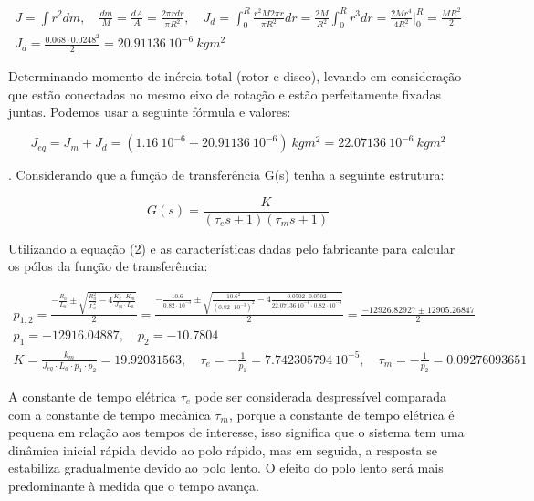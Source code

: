 \documentclass[10pt]{article}
\begin{document}
\begin{equation}
\begin{aligned}
    J = \int r^2 dm
    ,\quad \frac{dm}{M} = \frac{dA}{A} = \frac{2 \pi r dr}{\pi R^2}
    ,\quad J_d = \int_{0}^{R} \frac{r^2 M 2 \pi r}{\pi R^2} dr
    = \frac{2M}{R^2} \int_{0}^{R} r^3 dr
    = \frac{2Mr^4}{4R^2} \Bigg|_{0}^{R}
    = \frac{MR^2}{2} \\
    J_d = \frac{0.068 \cdot 0.0248^2}{2} = 20.91136 \ 10^{-6} \ kgm^2
\end{aligned}
\end{equation}

\quad Determinando momento de inércia total (rotor e disco),
levando em consideração que estão conectadas no mesmo eixo de rotação e
estão perfeitamente fixadas juntas. Podemos usar a seguinte fórmula e valores:

\begin{equation}
    J_{eq} = J_m + J_d = (1.16 \ 10^{-6} + 20.91136 \ 10^{-6}) \ kgm^2
    = 22.07136 \ 10^{-6} \ kgm^2
\end{equation}

. Considerando que a função de transferência G(s) tenha a seguinte estrutura:

\begin{equation}
    G(s) = \frac{K}{(\tau_e s + 1)(\tau_m s + 1)}
\end{equation}

\quad Utilizando a equação (2) e as características dadas pelo fabricante para calcular
os pólos da função de transferência:

\begin{equation}
\begin{aligned}
    p_{1,2} = \frac{-\frac{R_a}{L_a} \pm \sqrt{\frac{R_a^2}{L_a^2} - 4\frac{K_e \cdot K_m}{J_{eq} \cdot L_a}}}{2}
    = \frac{-\frac{10.6}{0.82 \cdot 10^{-3}} \pm \sqrt{\frac{10.6^2}{(0.82 \cdot 10^{-3})^2} - 4\frac{0.0502 \cdot 0.0502}{22.07136 \ 10^{-6} \cdot 0.82 \cdot 10^{-3}}}}{2}
    = \frac{-12926.82927 \pm 12905.26847}{2} \\
    p_1 = -12916.04887, \quad p_2 = -10.7804 \\
    K = \frac{k_m}{J_{eq} \cdot L_a \cdot p_1 \cdot p_2} = 19.92031563, \quad \tau_e = -\frac{1}{p_1} = 7.742305794 \ 10^{-5}, \quad \tau_m = -\frac{1}{p_2} = 0.09276093651
\end{aligned}
\end{equation}

\quad A constante de tempo elétrica $\tau_e$ pode ser considerada despressível
comparada com a constante de tempo mecânica $\tau_m$,
porque a constante de tempo elétrica é pequena em relação aos tempos de interesse,
isso significa que o sistema tem uma dinâmica inicial rápida devido ao polo rápido,
mas em seguida, a resposta se estabiliza gradualmente devido ao polo lento.
O efeito do polo lento será mais predominante à medida que o tempo avança.
\end{document}
